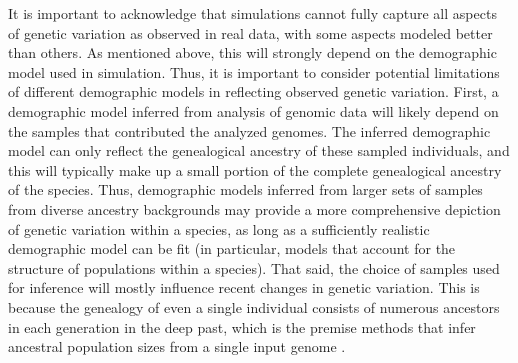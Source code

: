 \documentclass[hidelinks]{article}
\begin{document}
It is important to acknowledge that simulations cannot fully
capture all aspects of genetic variation as observed in real data,
with some aspects modeled better than others.
As mentioned above, this will strongly depend on the demographic model used in simulation.
Thus, it is important to consider potential limitations of different demographic models
in reflecting observed genetic variation.
First, a demographic model inferred from analysis of genomic data will likely depend on
the samples that contributed the analyzed genomes.
The inferred demographic model can only reflect the genealogical ancestry
of these sampled individuals, and this will typically make up a small portion
of the complete genealogical ancestry of the species.
Thus, demographic models inferred from larger sets of samples from diverse ancestry backgrounds
may provide a more comprehensive depiction of genetic variation within a species,
as long as a sufficiently realistic demographic model can be fit
(in particular, models that account for the structure of populations within a species).
That said, the choice of samples used for inference will mostly influence
recent changes in genetic variation.
This is because the genealogy of even a single individual consists of numerous ancestors
in each generation in the deep past,
which is the premise methods that infer ancestral population sizes from a single input genome
\citep{LiDurbin2011}.
\end{document}
